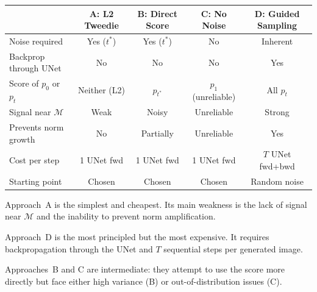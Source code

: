 \documentclass[11pt]{article}
\begin{document}
\begin{center}
\begin{tabular}{l c c c c}
\hline
& \textbf{A: L2 Tweedie} & \textbf{B: Direct Score} & \textbf{C: No Noise} & \textbf{D: Guided Sampling} \\
\hline
Noise required          & Yes ($t^*$)   & Yes ($t^*$)   & No            & Inherent \\
Backprop through UNet   & No            & No            & No            & Yes \\
Score of $p_0$ or $p_t$ & Neither (L2)  & $p_{t^*}$     & $p_1$ (unreliable) & All $p_t$ \\
Signal near $\mathcal{M}$ & Weak        & Noisy         & Unreliable    & Strong \\
Prevents norm growth    & No            & Partially     & Unreliable    & Yes \\
Cost per step           & 1 UNet fwd    & 1 UNet fwd    & 1 UNet fwd    & $T$ UNet fwd+bwd \\
Starting point          & Chosen        & Chosen        & Chosen        & Random noise \\
\hline
\end{tabular}
\end{center}

Approach~A is the simplest and cheapest. Its main weakness is the lack of signal near
$\mathcal{M}$ and the inability to prevent norm amplification.

Approach~D is the most principled but the most expensive. It requires backpropagation
through the UNet and $T$ sequential steps per generated image.

Approaches~B and C are intermediate: they attempt to use the score more directly but
face either high variance (B) or out-of-distribution issues (C).
\end{document}
